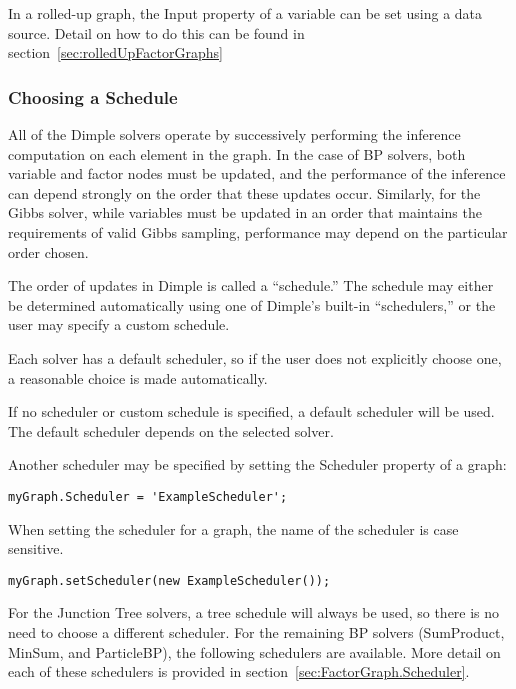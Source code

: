 In a rolled-up graph, the Input property of a variable can be set using a data source.  Detail on how to do this can be found in section~\ref{sec:rolledUpFactorGraphs}



\subsubsection{Choosing a Schedule}

All of the Dimple solvers operate by successively performing the inference computation on each element in the graph.  In the case of BP solvers, both variable and factor nodes must be updated, and the performance of the inference can depend strongly on the order that these updates occur.  Similarly, for the Gibbs solver, while variables must be updated in an order that maintains the requirements of valid Gibbs sampling, performance may depend on the particular order chosen.

The order of updates in Dimple is called a ``schedule.''  The schedule may either be determined automatically using one of Dimple's built-in ``schedulers,'' or the user may specify a custom schedule.

Each solver has a default scheduler, so if the user does not explicitly choose one, a reasonable choice is made automatically.



If no scheduler or custom schedule is specified, a default scheduler will be used.  The default scheduler depends on the selected solver.

Another scheduler may be specified by setting the Scheduler property of a graph:

\ifmatlab

\begin{lstlisting}
myGraph.Scheduler = 'ExampleScheduler';	
\end{lstlisting}

When setting the scheduler for a graph, the name of the scheduler is case sensitive.

\fi

\ifjava
\begin{lstlisting}
myGraph.setScheduler(new ExampleScheduler());
\end{lstlisting}
\fi

For the Junction Tree solvers, a tree schedule will always be used, so there is no need to choose a different scheduler. For the remaining BP solvers (SumProduct, MinSum, and ParticleBP), the following schedulers are available.  More detail on each of these schedulers is provided in section~\ref{sec:FactorGraph.Scheduler}.

